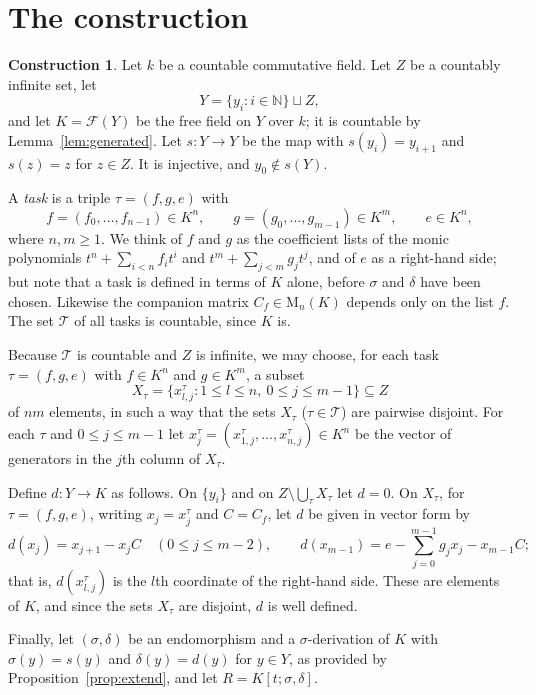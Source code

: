 \documentclass[11pt]{amsart}
\theoremstyle{plain}
\theoremstyle{definition}
\newtheorem{construction}[theorem]{Construction}
\theoremstyle{remark}
\newcommand{\N}{\mathbb N}
\newcommand{\M}{\mathrm M}
\newcommand{\ff}[1]{\mathcal F(#1)}
\newcommand{\T}{\mathcal T}
\begin{document}
\section{The construction}\label{sec:construction}

\begin{construction}\label{constr}
Let $k$ be a countable commutative field. Let $Z$ be a countably infinite set, let
\[
Y=\{y_i:i\in\N\}\sqcup Z,
\]
and let $K=\ff Y$ be the free field on $Y$ over $k$; it is countable by Lemma~\ref{lem:generated}. Let $s\colon Y\to Y$ be the map with $s(y_i)=y_{i+1}$ and $s(z)=z$ for $z\in Z$. It is injective, and $y_0\notin s(Y)$.

A \emph{task} is a triple $\tau=(f,g,e)$ with
\[
f=(f_0,\dots,f_{n-1})\in K^n,\qquad g=(g_0,\dots,g_{m-1})\in K^m,\qquad e\in K^n,
\]
where $n,m\ge1$. We think of $f$ and $g$ as the coefficient lists of the monic polynomials $t^n+\sum_{i<n}f_it^i$ and $t^m+\sum_{j<m}g_jt^j$, and of $e$ as a right-hand side; but note that a task is defined in terms of $K$ alone, before $\sigma$ and $\delta$ have been chosen. Likewise the companion matrix $C_f\in\M_n(K)$ depends only on the list $f$. The set $\T$ of all tasks is countable, since $K$ is.

Because $\T$ is countable and $Z$ is infinite, we may choose, for each task $\tau=(f,g,e)$ with $f\in K^n$ and $g\in K^m$, a subset
\[
X_\tau=\{x^\tau_{l,j}:1\le l\le n,\ 0\le j\le m-1\}\subseteq Z
\]
of $nm$ elements, in such a way that the sets $X_\tau$ ($\tau\in\T$) are pairwise disjoint. For each $\tau$ and $0\le j\le m-1$ let $x^\tau_j=(x^\tau_{1,j},\dots,x^\tau_{n,j})\in K^n$ be the vector of generators in the $j$th column of $X_\tau$.

Define $d\colon Y\to K$ as follows. On $\{y_i\}$ and on $Z\setminus\bigcup_\tau X_\tau$ let $d=0$. On $X_\tau$, for $\tau=(f,g,e)$, writing $x_j=x^\tau_j$ and $C=C_f$, let $d$ be given in vector form by
\begin{equation}\label{eq:d}
d(x_j)=x_{j+1}-x_jC\quad(0\le j\le m-2),\qquad d(x_{m-1})=e-\sum_{j=0}^{m-1}g_jx_j-x_{m-1}C ;
\end{equation}
that is, $d(x^\tau_{l,j})$ is the $l$th coordinate of the right-hand side. These are elements of $K$, and since the sets $X_\tau$ are disjoint, $d$ is well defined.

Finally, let $(\sigma,\delta)$ be an endomorphism and a $\sigma$-derivation of $K$ with $\sigma(y)=s(y)$ and $\delta(y)=d(y)$ for $y\in Y$, as provided by Proposition~\ref{prop:extend}, and let $R=K[t;\sigma,\delta]$.
\end{construction}
\end{document}
